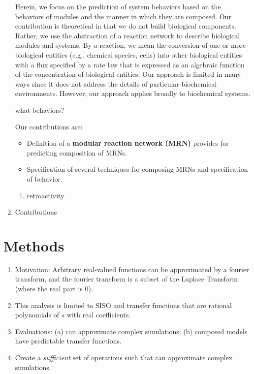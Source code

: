 \documentclass[unnumsec,webpdf,contemporary,large]{oup-authoring-template}%
\theoremstyle{thmstyleone}%
\theoremstyle{thmstyletwo}%
\theoremstyle{thmstylethree}%
\begin{document}
\begin{enumerate}
Herein, we focus on the prediction of system behaviors based on the
behaviors of modules and the manner in which they are composed.
Our contribution is theoretical in that we do not build biological components.
Rather, we use the abstraction of a reaction network to
describe biological modules and systems.
By a reaction, we mean the conversion of one or more 
biological entities (e.g., chemical species, cells)
into other biological entities with a flux specified by a rate law
that is expressed
as an algebraic function of the concentration of biological entities.
Our approach is limited in many ways since it
does not address the details of particular biochemical environments.
However, our approach applies broadly to biochemical systems.

{\color{red} what behaviors?} \color{black}

Our contributions are:
\begin{itemize}
\item
Definition of a {\bf modular reaction network (MRN)} provides for predicting
composition of MRNs.
\item
Specification of several techniques for composing MRNs and specification
of behavior.
\end{itemize}

\begin{enumerate}
\item
retroactivity
\end{enumerate}

\item Contributions
\end{enumerate}



\section{Methods}\label{methods}
\begin{enumerate}
\item
Motivation: 
Arbitrary real-valued functions can be approximated by a fourier transform,
and the fourier transform is a subset of the Laplace Transform (where the real part is 0).
\item
This analysis is limited to SISO and transfer functions that
are rational polynomials of $s$ with real coefficients.
\item
Evaluations: (a) can approximate complex simulations; (b) composed models have predictable transfer functions.
\item
Create a {\em sufficient} set of operations such that can
approximate complex simulations.
\end{enumerate}
\end{document}

